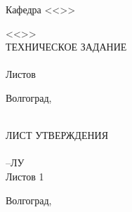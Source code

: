 {{  %
}%
{
\clearpage
\thispagestyle{empty}
\addtocounter{page}{-1}
\begin{center}
\VSTUTitleHeading
Кафедра <<\VSTUDepartment>>\\
\end{center}
\vspace{\fill}
\hfill\VSTUTitleHeadApproval
\vspace{8mm}
\begin{center}
<<\VSTUTitle>>\\
\vspace{\fill}
ТЕХНИЧЕСКОЕ ЗАДАНИЕ\\
\vspace{8mm}
\VSTUDocumentCode\\
\vspace{8mm}
Листов \totalpages\\
\vspace{8mm}
\end{center}
\begin{flushright}
\VSTUTitleDirector
\end{flushright}
\vspace{8mm}
\begin{flushleft}
\VSTUTitleStandardsAdviser
\hfill
\VSTUTitleImplementer
\end{flushleft}
\vspace{\fill}
\begin{center}
Волгоград,~\the\year
\end{center}
\newpage
\clearpage
\thispagestyle{empty}
\hfill\VSTUTitleHeadApproval
\vspace{\fill}
\begin{center}
\VSTUTitle\\
\vspace{8mm}
ЛИСТ УТВЕРЖДЕНИЯ\\
\VSTUDocumentCode\\
\VSTULUCode--ЛУ\\
Листов 1\\
\vspace{\fill}
\end{center}
\begin{flushright}
\VSTUTitleStandardsAdviser
\vfill
\VSTUTitleImplementer
\end{flushright}
\vspace{\fill}
\begin{center}
Волгоград,~\the\year
\end{center}
\newpage
}
}
